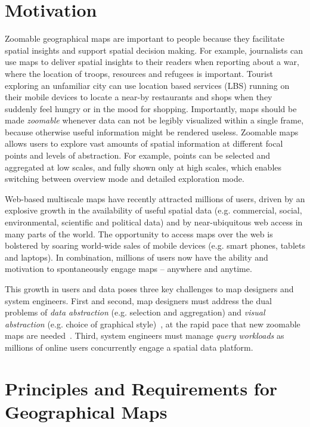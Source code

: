 \documentclass[11pt, oneside]{report}   	%
\begin{document}
\section{Motivation}
Zoomable geographical maps are important to people because they facilitate spatial insights and support spatial decision making. For example, journalists can use maps to deliver spatial insights to their readers when reporting about a war, where the location of troops, resources and refugees is important. Tourist exploring an unfamiliar city can use location based services (LBS) running on their mobile devices to locate a near-by restaurants and shops when they suddenly feel hungry or in the mood for shopping. Importantly, maps should be made \emph{zoomable} whenever data can not be legibly visualized within a single frame, because otherwise useful information might be rendered useless. Zoomable maps allows users to explore vast amounts of spatial information at different focal points and levels of abstraction. For example, points can be selected and aggregated at low scales, and fully shown only at high scales, which enables switching between overview mode and detailed exploration mode.

Web-based multiscale maps have recently attracted millions of users, driven by an explosive growth in the availability of useful spatial data (e.g. commercial, social, environmental, scientific and political data) and by near-ubiquitous web access in many parts of the world. The opportunity to access maps over the web is bolstered by soaring world-wide sales of mobile devices (e.g. smart phones, tablets and laptops). In combination, millions of users now have the ability and motivation to spontaneously engage maps -- anywhere and anytime.

This growth in users and data poses three key challenges to map designers and system engineers. First and second, map designers must address the dual problems of \emph{data abstraction} (e.g. selection and aggregation) and \emph{visual abstraction} (e.g. choice of graphical style)~\cite{stolte2003multiscale}, at the rapid pace that new zoomable maps are needed~\cite{lomet2012warstories}. Third, system engineers must manage \emph{query workloads} as millions of online users concurrently engage a spatial data platform.




\section{Principles and Requirements for Geographical Maps}
\end{document}
